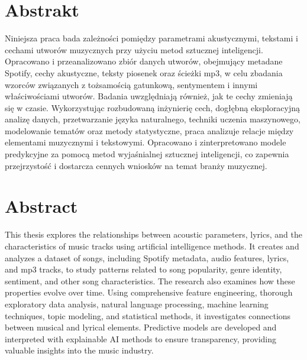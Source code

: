 \documentclass[oneside, 12pt]{book}
\begin{document}
\thispagestyle{empty}





\chapter*{Abstrakt}
Niniejsza praca bada zależności pomiędzy parametrami akustycznymi, tekstami i 
cechami utworów muzycznych przy użyciu metod sztucznej inteligencji. Opracowano
i przeanalizowano zbiór danych utworów, obejmujący metadane Spotify, cechy
akustyczne, teksty piosenek oraz ścieżki mp3, w celu zbadania wzorców
związanych z tożsamością gatunkową, sentymentem i innymi właściwościami
utworów. Badania uwzględniają również, jak te cechy zmieniają się w czasie.
Wykorzystując rozbudowaną inżynierię cech, dogłębną eksploracyjną analizę
danych, przetwarzanie języka naturalnego, techniki uczenia maszynowego,
modelowanie tematów oraz metody statystyczne, praca analizuje relacje między
elementami muzycznymi i tekstowymi. Opracowano i zinterpretowano modele
predykcyjne za pomocą metod wyjaśnialnej sztucznej inteligencji, co zapewnia
przejrzystość i dostarcza cennych wniosków na temat branży muzycznej.

\chapter*{Abstract}
This thesis explores the relationships between acoustic parameters, lyrics, and
the characteristics of music tracks using artificial intelligence methods. It
creates and analyzes a dataset of songs, including Spotify metadata, audio
features, lyrics, and mp3 tracks, to study patterns related to song popularity,
genre identity, sentiment, and other song characteristics. The research also
examines how these properties evolve over time. Using comprehensive feature
engineering, thorough exploratory data analysis, natural language processing,
machine learning techniques, topic modeling, and statistical methods, it
investigates connections between musical and lyrical elements. Predictive
models are developed and interpreted with explainable AI methods to ensure
transparency, providing valuable insights into the music industry.






\tableofcontents
\clearpage








% 
% 

\cleardoublepage %
\printbibliography[title={Bibliography}]
\end{document}
